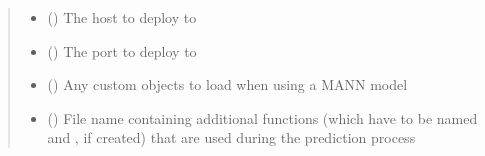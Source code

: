 \documentclass[letterpaper,10pt,english]{sphinxmanual}
\begin{document}
\begin{fulllineitems}
\begin{quote}
\begin{description}
\begin{itemize}
\item {} 
\sphinxAtStartPar
{} (\sphinxstyleliteralemphasis{\sphinxupquote{ (}}\sphinxstyleliteralemphasis{\sphinxupquote{)}}) \textendash{} The host to deploy to

\item {} 
\sphinxAtStartPar
{} (\sphinxstyleliteralemphasis{\sphinxupquote{ (}}\sphinxstyleliteralemphasis{\sphinxupquote{)}}) \textendash{} The port to deploy to

\item {} 
\sphinxAtStartPar
{} (\sphinxstyleliteralemphasis{\sphinxupquote{ (}}\sphinxstyleliteralemphasis{\sphinxupquote{)}}) \textendash{} Any custom objects to load when using a MANN model

\item {} 
\sphinxAtStartPar
{} (\sphinxstyleliteralemphasis{\sphinxupquote{ (}}\sphinxstyleliteralemphasis{\sphinxupquote{)}}) \textendash{} File name containing additional functions (which have to be named  and , if created)
that are used during the prediction process

\end{itemize}

\end{description}\end{quote}

\end{fulllineitems}

\end{document}
